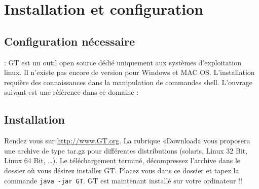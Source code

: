 \section{Installation et configuration}

\subsection{Configuration nécessaire}
\label{sec:conf}
\danger : GT est un outil open source dédié uniquement aux systèmes d'exploitation linux. Il n'existe pas encore de version pour Windows et MAC OS. L'installation requière des connaissances dans la manipulation de commandes shell. L'ouvrage suivant est une référence dans ce domaine : \cite{Nutshell}    

\subsection{Installation}
\label{sec:install}
Rendez vous sur \url{http://www.GT.org}. La rubrique «Download» vous proposera une archive de type tar.gz pour différentes distributions (solaris, Linux 32 Bit, Linux 64 Bit, \dots ). Le téléchargement terminé, décompressez l'archive dans le dossier où vous désirez installer GT. Placez vous dans ce dossier et tapez la commande \verb+java -jar GT+. GT est maintenant installé sur votre ordinateur \smiley !!  


